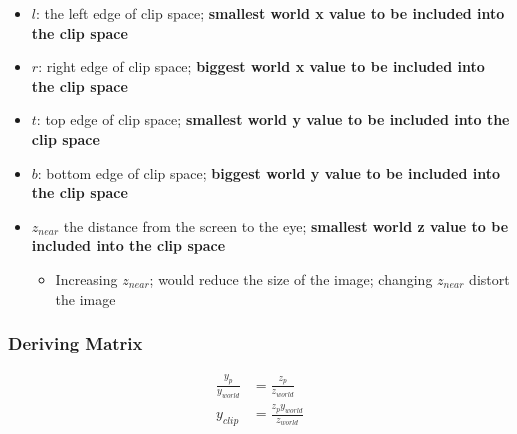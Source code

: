     \begin{itemize}
      \item $ l $: the left edge of clip space; \textbf{smallest world x value
      to be included into the clip space}
      \item $ r $: right edge of clip space; \textbf{biggest world x value
      to be included into the clip space}
      \item $ t $: top edge of clip space; \textbf{smallest world y value
      to be included into the clip space}
      \item $ b $: bottom edge of clip space; \textbf{biggest world y value
      to be included into the clip space}
      \item $ z_{near} $ the distance from the screen to the eye; \textbf{
      smallest world z value to be included into the clip space}
      \begin{itemize}
        \item Increasing $ z_{near} $; would reduce the size of the image; changing
        $ z_{near} $ distort the image
      \end{itemize}
    \end{itemize}

  \subsubsection{Deriving Matrix}

    \begin{figure}[H]
      \centering
    \end{figure}

    \begin{align}
      \frac{y_{p}}{y_{world}} &= \frac{z_{p}}{z_{world}} \\
      y_{clip} &= \frac{z_{p} y_{world}}{z_{world}}
    \end{align}

